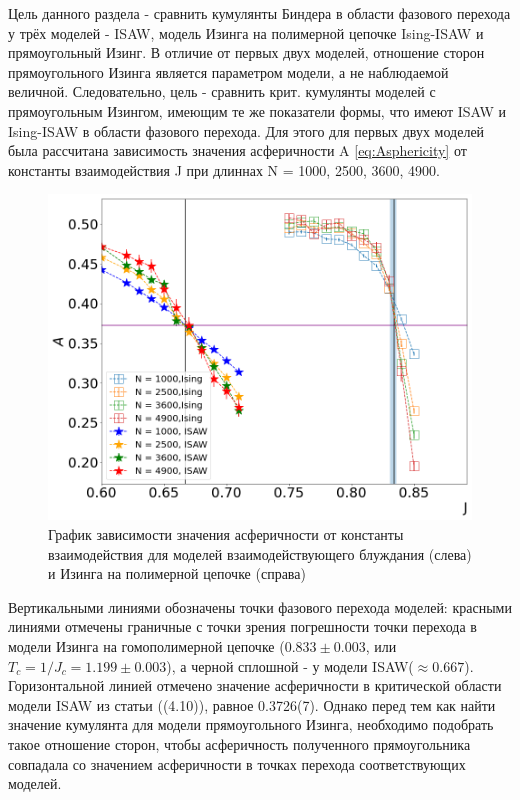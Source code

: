 Цель данного раздела - сравнить кумулянты Биндера в области фазового перехода у трёх моделей - ISAW, модель Изинга на полимерной цепочке Ising-ISAW и прямоугольный Изинг. В отличие от первых двух моделей, отношение сторон прямоугольного Изинга является параметром модели, а не наблюдаемой величной. Следовательно, цель - сравнить крит. кумулянты моделей с прямоугольным Изингом, имеющим те же показатели формы, что имеют ISAW и Ising-ISAW в области фазового перехода. 
Для этого для первых двух моделей была рассчитана зависимость значения асферичности A \eqref{eq:Asphericity} от константы взаимодействия J при длиннах N = 1000, 2500, 3600, 4900.
\newpage
\begin{figure}[h!]
    \centering
    \includegraphics[width=150mm]{Sections/Images/Ising_ISAW_A_J_Full.png}
    \caption{График зависимости значения асферичности от константы взаимодействия для моделей взаимодействующего блуждания (слева) и Изинга на полимерной цепочке (справа)}
    \label{fig:A_J}
\end{figure}

Вертикальными линиями обозначены точки фазового перехода моделей: красными линиями отмечены граничные с точки зрения погрешности точки перехода в модели Изинга на гомополимерной цепочке ($0.833 \pm 0.003$, или $T_{c}=1/J_{c} = 1.199\pm0.003$\cite{foster2021critical}), а черной сплошной - у модели ISAW($\approx 0.667$\cite{caracciolo2011geometrical}). Горизонтальной линией отмечено значение асферичности в критической области модели ISAW из статьи ((4.10)\cite{caracciolo2011geometrical}), равное 0.3726(7). Однако перед тем как найти значение кумулянта для модели прямоугольного Изинга, необходимо подобрать такое отношение сторон, чтобы асферичность полученного прямоугольника совпадала со значением асферичности в точках перехода соответствующих моделей.

